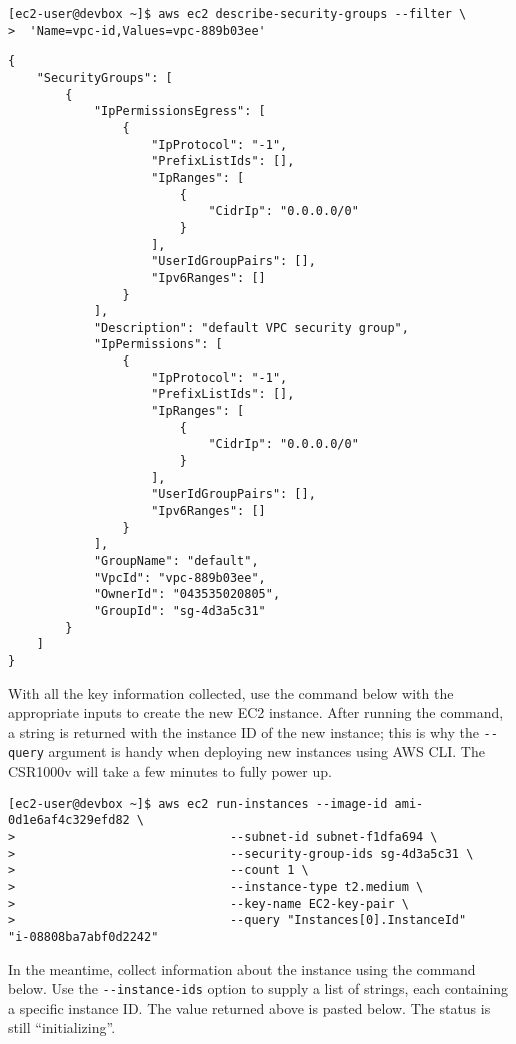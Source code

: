 \begin{verbatim}
[ec2-user@devbox ~]$ aws ec2 describe-security-groups --filter \
>  'Name=vpc-id,Values=vpc-889b03ee'
\end{verbatim}

\begin{verbatim}
{
    "SecurityGroups": [
        {
            "IpPermissionsEgress": [
                {
                    "IpProtocol": "-1", 
                    "PrefixListIds": [], 
                    "IpRanges": [
                        {
                            "CidrIp": "0.0.0.0/0"
                        }
                    ], 
                    "UserIdGroupPairs": [], 
                    "Ipv6Ranges": []
                }
            ], 
            "Description": "default VPC security group", 
            "IpPermissions": [
                {
                    "IpProtocol": "-1", 
                    "PrefixListIds": [], 
                    "IpRanges": [
                        {
                            "CidrIp": "0.0.0.0/0"
                        }
                    ], 
                    "UserIdGroupPairs": [], 
                    "Ipv6Ranges": []
                }
            ], 
            "GroupName": "default", 
            "VpcId": "vpc-889b03ee", 
            "OwnerId": "043535020805", 
            "GroupId": "sg-4d3a5c31"
        }
    ]
}
\end{verbatim}

With all the key information collected, use the command below with the
appropriate inputs to create the new EC2 instance. After running the command,
a string is returned with the instance ID of the new instance; this is why the
\verb|--query| argument is handy when deploying new instances using AWS CLI. The
CSR1000v will take a few minutes to fully power up.

\begin{verbatim}
[ec2-user@devbox ~]$ aws ec2 run-instances --image-id ami-0d1e6af4c329efd82 \
>                              --subnet-id subnet-f1dfa694 \
>                              --security-group-ids sg-4d3a5c31 \
>                              --count 1 \
>                              --instance-type t2.medium \
>                              --key-name EC2-key-pair \
>                              --query "Instances[0].InstanceId"
"i-08808ba7abf0d2242"
\end{verbatim}

In the meantime, collect information about the instance using the command
below. Use the \verb|--instance-ids| option to supply a list of strings, each
containing a specific instance ID. The value returned above is pasted below.
The status is still ``initializing''.

